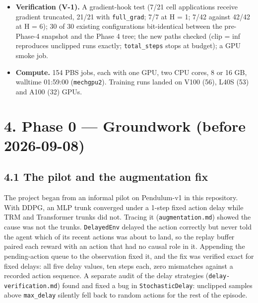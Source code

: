 \documentclass[11pt]{article}
\begin{document}
\begin{itemize}
\item \textbf{Verification (V-1).} A gradient-hook test (7/21 cell applications receive gradient truncated, 21/21 with \texttt{full\_grad}; 7/7 at H = 1; 7/42 against 42/42 at H = 6); 30 of 30 existing configurations bit-identical between the pre-Phase-4 snapshot and the Phase 4 tree; the new paths checked (clip = inf reproduces unclipped runs exactly; \texttt{total\_steps} stops at budget); a GPU smoke job.
\item \textbf{Compute.} 154 PBS jobs, each with one GPU, two CPU cores, 8 or 16 GB, walltime 01:59:00 (\texttt{mechgpu2}). Training runs landed on V100 (56), L40S (53) and A100 (32) GPUs.
\end{itemize}





\medskip



\section*{4. Phase 0 --- Groundwork (before 2026-09-08)}



\subsection*{4.1 The pilot and the augmentation fix}



The project began from an informal pilot on Pendulum-v1 in this repository. With DDPG, an MLP trunk converged under a 1-step fixed action delay while TRM and Transformer trunks did not. Tracing it (\texttt{augmentation.\allowbreak{}md}) showed the cause was not the trunks. \texttt{DelayedEnv} delayed the action correctly but never told the agent which of its recent actions was about to land, so the replay buffer paired each reward with an action that had no causal role in it. Appending the pending-action queue to the observation fixed it, and the fix was verified exact for fixed delays: all five delay values, ten steps each, zero mismatches against a recorded action sequence. A separate audit of the delay strategies (\texttt{delay-verification.\allowbreak{}md}) found and fixed a bug in \texttt{StochasticDelay}: unclipped samples above \texttt{max\_delay} silently fell back to random actions for the rest of the episode.
\end{document}
